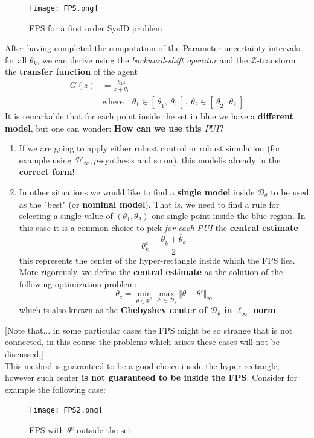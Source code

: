 \begin{figure}[h]
    \centering 
    \texttt{[image: FPS.png]}
    \caption {FPS for a first order SysID problem}
\end{figure}
\noindent
After having completed the computation of the Parameter uncertainty intervals for all $\theta_k$, we can derive using the \textit{backward-shift operator} and the $\mathcal{Z}$-transform the \textbf{transfer function} of the agent
\begin{align*}
    G(z) &= \frac{\theta_2 z}{z+\theta_1}\\
    &  \text{where} \quad \theta_1 \in [\ \underline{\theta}_1, \ \overline{\theta}_1 \ ], \ \theta_2 \in [\ \underline{\theta}_2, \ \overline{\theta}_2 \ ]
\end{align*}
It is remarkable that for each point inside the set in blue we have a \textbf{different model}, but one can wonder: \textbf{How can we use this $PUI$?}
\begin{enumerate}
    \item If we are going to apply either robust control or robust simulation (for example using $\mathcal{H}_\infty, \mu$-synthesis and so on), this modelis already in the \textbf{correct form}!
    \item In other situations we would like to find a \textbf{single model} inside $\mathcal{D}_\theta$ to be used as the "best" (or \textbf{nominal model}). That is, we need to find a rule for selecting a single value of $(\theta_1, \theta_2)$ one single point inside the blue region. In this case it is a common choice to pick \textit{for each PUI} the \textbf{central estimate}
    {\large{
        \begin{equation*}
            \theta_k^c = \frac{\underline{\theta}_k+\overline{\theta}_k}{2}
        \end{equation*}
    }}
    \noindent
    this represents the center of the hyper-rectangle inside which the FPS lies. More rigorously, we define the \textbf{central estimate} as the solution of the following optimization problem:
    \begin{equation}
        \theta_c = \min_{\theta\in\mathbb{R}^2} \max_{\theta'\in\mathcal{D}_\theta} \Vert \theta-\theta' \Vert_\infty
    \end{equation}
    which is also known as the \textbf{Chebyshev center of $\mathcal{D}_\theta$ in $\ell_\infty$ norm}
\end{enumerate}
[Note that... in some particular cases the FPS might be so strange that is not connected, in this course the problems which arises these cases will not be discussed.]\\
This method is guaranteed to be a good choice inside the hyper-rectangle, however such center \textbf{is not guaranteed to be inside the FPS}. Consider for example the following case: 
\begin{figure}[h]
    \centering
    \texttt{[image: FPS2.png]}
    \caption{FPS with $\theta^c$ outside the set}
\end{figure}

